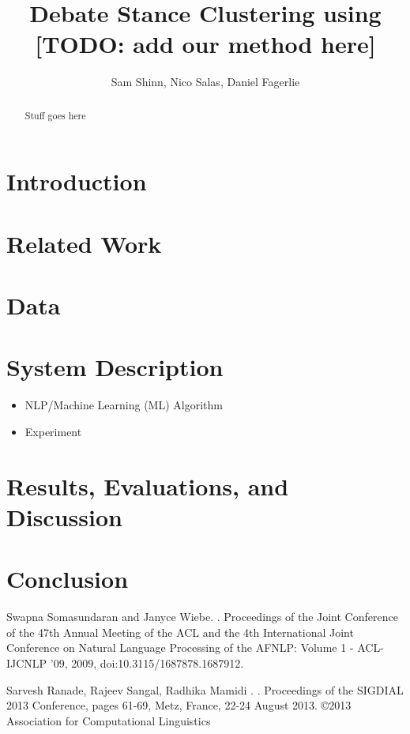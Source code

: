 \documentclass[11pt]{article}
\title{Debate Stance Clustering using [TODO: add our method here]}
\author{
  Sam Shinn,
  Nico Salas,
  Daniel Fagerlie 
}
\date{}
\begin{document}
\maketitle
\begin{abstract}
Stuff goes here
\end{abstract}

\section{Introduction}



\section{Related Work}



\section{Data}



\section{System Description}
\begin{itemize}
\item NLP/Machine Learning (ML) Algorithm
\item Experiment
\end{itemize}



\section{Results, Evaluations, and Discussion}



\section{Conclusion}



\begin{thebibliography}{}
Swapna Somasundaran and Janyce Wiebe.
.
\newblock Proceedings of the Joint Conference of the 47th Annual Meeting of the ACL and the 4th International Joint Conference on Natural Language Processing of the AFNLP: Volume 1 - ACL-IJCNLP '09, 2009, doi:10.3115/1687878.1687912. 


Sarvesh Ranade, Rajeev Sangal, Radhika Mamidi
.
.
\newblock Proceedings of the SIGDIAL 2013 Conference, pages 61-69, Metz, France, 22-24 August 2013. ©2013 Association for Computational Linguistics

\end{thebibliography}
\end{document}
